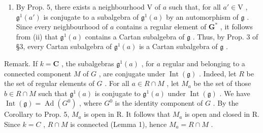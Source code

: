 \begin{enumerate}
\def\labelenumi{(\roman{enumi})}
\setcounter{enumi}{2}
\tightlist
\item
  By Prop. 5, there exists a neighbourhood \(\mathrm{V}\) of \(a\) such that, for all \(a' \in \mathrm{V}\) , \(\mathfrak{g}^1(a')\) is conjugate to a subalgebra of \(\mathfrak{g}^1(a)\) by an automorphism of \(\mathfrak{g}\) . Since every neighbourhood of \(a\) contains a regular element of \(\mathbf{G}^*\) , it follows from (ii) that \(\mathfrak{g}^1(a)\) contains a Cartan subalgebra of \(\mathfrak{g}\) . Thus, by Prop. 3 of §3, every Cartan subalgebra of \(\mathfrak{g}^1(a)\) is a Cartan subalgebra of \(\mathfrak{g}\) .
\end{enumerate}

Remark. If \(k = \mathbf{C}\) , the subalgebras \(\mathfrak{g}^1(a)\) , for \(a\) regular and belonging to a connected component \(M\) of \(G\) , are conjugate under \(\operatorname{Int}(\mathfrak{g})\) . Indeed, let \(R\) be the set of regular elements of \(G\) . For all \(a \in R \cap M\) , let \(M_a\) be the set of those \(b \in R \cap M\) such that \(\mathfrak{g}^1(a)\) is conjugate to \(\mathfrak{g}^1(a)\) under \(\operatorname{Int}(\mathfrak{g})\) . We have \(\operatorname{Int}(\mathfrak{g}) = \operatorname{Ad}(G^0)\) , where \(G^0\) is the identity component of \(G\) . By the Corollary to Prop. 5, \(M_{a}\) is open in R. It follows that \(M_{a}\) is open and closed in R. Since \(k = C\) , \(R \cap M\) is connected (Lemma 1), hence \(M_{a} = R \cap M\) .

